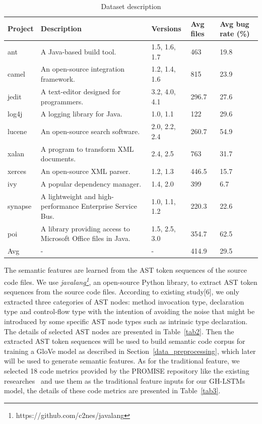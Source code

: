 \documentclass[journal]{IEEEtran}
\begin{document}
\begin{table}[htbp]
	\footnotesize
	\caption{Dataset description}
	\label{tab1}
	\tabcolsep 11pt
	\centering
	\begin{tabular}{lllll}
		\toprule
		Project & Description &Versions & Avg files & Avg bug rate (\%) \\\midrule
		ant     & A Java-based build tool.&1.5, 1.6, 1.7 & 463    & 19.8\\
		camel   & An open-source integration framework.&1.2, 1.4, 1.6 & 815    & 23.9\\
		jedit   & A text-editor designed for programmers.&3.2, 4.0, 4.1 & 296.7  & 27.6\\
		log4j   & A logging library for Java.&1.0, 1.1      & 122    & 29.6\\
		lucene  & An open-source search software.&2.0, 2.2, 2.4 & 260.7  & 54.9\\
		xalan   & A program to transform XML documents.&2.4, 2.5      & 763    & 31.7\\
		xerces  & An open-source XML parser.&1.2, 1.3      & 446.5  & 15.7\\
		ivy     & A popular dependency manager.&1.4, 2.0      & 399    & 6.7 \\
		synapse & A lightweight and high-performance Enterprise Service Bus.&1.0, 1.1, 1.2 & 220.3  & 22.6\\
		poi     & A library providing access to Microsoft Office files in Java. &1.5, 2.5, 3.0 & 354.7  & 62.5\\
		Avg     & -&-             & 414.9  & 29.5\\
		\bottomrule
	\end{tabular}
\end{table}
The semantic features are learned from the AST token sequences of the source code files. We use \textit{javalang\footnote{https://github.com/c2nes/javalang}}, an open-source Python library, to extract AST token sequences from the source code files. According to existing study[6], we only extracted three categories of AST nodes: method invocation type, declaration type and control-flow type with the intention of avoiding the noise that might be introduced by some specific AST node types such as intrinsic type declaration. The details of selected AST nodes are presented in Table~\ref{tab2}. Then the extracted AST token sequences will be used to build semantic code corpus for training a GloVe model as described in Section~\ref{data_preprocessing}, which later will be used to generate semantic features. As for the traditional feature, we selected 18 code metrics provided by the PROMISE repository like the existing researches~\cite{wang2018deep,fan2019deep} and use them as the traditional feature inputs for our GH-LSTMs model, the details of these code metrics are presented in Table~\ref{tab3}.
\end{document}
